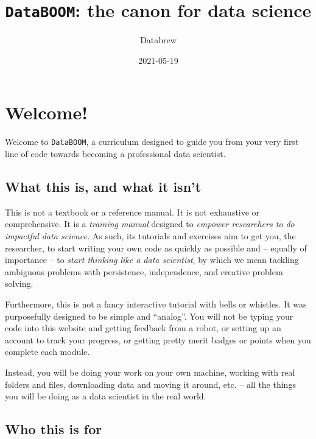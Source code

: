 \documentclass[
]{book}
\title{\texttt{DataBOOM}: the canon for data science}
\author{Databrew}
\date{2021-05-19}
\begin{document}
\maketitle

{
\setcounter{tocdepth}{1}
\tableofcontents
}
\hypertarget{welcome}{%
\chapter{Welcome!}\label{welcome}}

Welcome to \texttt{DataBOOM}, a curriculum designed to guide you from your very first line of code towards becoming a professional data scientist.

\hypertarget{what-this-is-and-what-it-isnt}{%
\section*{What this is, and what it isn't}\label{what-this-is-and-what-it-isnt}}

This is not a textbook or a reference manual. It is not exhaustive or comprehensive. It is a \emph{training manual} designed to \emph{empower researchers to do impactful data science.} As such, its tutorials and exercises aim to get you, the researcher, to start writing your own code as quickly as possible and -- equally of importance -- to \emph{start thinking like a data scientist}, by which we mean tackling ambiguous problems with persistence, independence, and creative problem solving.

Furthermore, this is not a fancy interactive tutorial with bells or whistles. It was purposefully designed to be simple and ``analog''. You will not be typing your code into this website and getting feedback from a robot, or setting up an account to track your progress, or getting pretty merit badges or points when you complete each module.

Instead, you will be doing your work on your own machine, working with real folders and files, downloading data and moving it around, etc. -- all the things you will be doing as a data scientist in the real world.

\hypertarget{who-this-is-for}{%
\section*{Who this is for}\label{who-this-is-for}}
\end{document}
